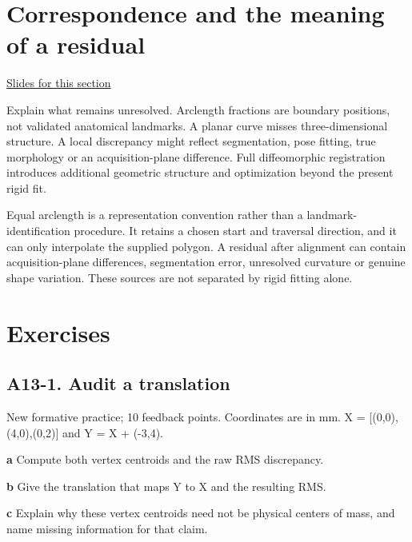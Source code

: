 \documentclass[11pt,letterpaper]{article}
\theoremstyle{definition}\newtheorem{definition}{Definition}\newtheorem{example}{Example}
\numberwithin{equation}{section}
\begin{document}
\section{Correspondence and the meaning of a residual}
\hypertarget{note-correspondence-and-the-meaning-of-a-residual}{}\label{note:correspondence-and-the-meaning-of-a-residual}
{\small \href{slides.html\#frame=residual-components\&step=1}{Slides for this section}}\par
Explain what remains unresolved. Arclength fractions are boundary positions, not validated anatomical landmarks. A planar curve misses three-dimensional structure. A local discrepancy might reflect segmentation, pose fitting, true morphology or an acquisition-plane difference. Full diffeomorphic registration introduces additional geometric structure and optimization beyond the present rigid fit.

Equal arclength is a representation convention rather than a landmark-identification procedure. It retains a chosen start and traversal direction, and it can only interpolate the supplied polygon. A residual after alignment can contain acquisition-plane differences, segmentation error, unresolved curvature or genuine shape variation. These sources are not separated by rigid fitting alone.
\bigskip
\section*{Exercises}
\par\noindent\begin{minipage}{\linewidth}
\subsection*{A13-1. Audit a translation}
New formative practice; 10 feedback points. Coordinates are in mm. X =\allowbreak{} [(0,0),(4,0),(0,2)] and Y =\allowbreak{} X +\allowbreak{} (-3,4).

\textbf{a} Compute both vertex centroids and the raw RMS discrepancy.

\end{minipage}\par\medskip
\textbf{b} Give the translation that maps Y to X and the resulting RMS.

\textbf{c} Explain why these vertex centroids need not be physical centers of mass, and name missing information for that claim.
\end{document}
